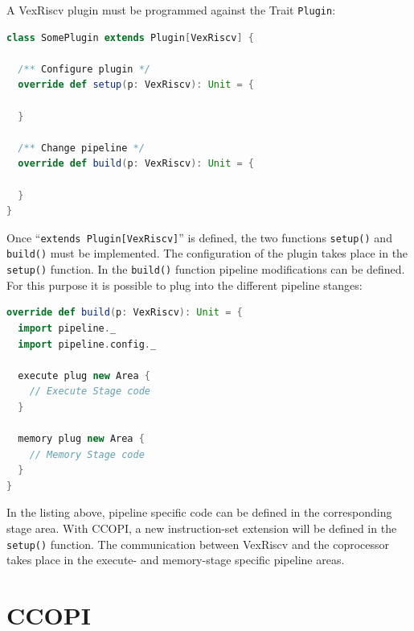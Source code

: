 \documentclass[twoside,twocolumn]{article}
\newcommand{\code}[1]{\texttt{#1}}
\begin{document}
A VexRiscv plugin must be programmed against the Trait \code{Plugin}:
\begin{lstlisting}[language=scala]
class SomePlugin extends Plugin[VexRiscv] {

  /** Configure plugin */
  override def setup(p: VexRiscv): Unit = {
  
  }
  
  /** Change pipeline */
  override def build(p: VexRiscv): Unit = {
  
  }
}
\end{lstlisting}
\noindent Once ``\code{extends Plugin[VexRiscv]}'' is defined, the two
functions \code{setup()} and \code{build()} must be implemented. The
configuration of the plugin takes place in the \code{setup()} function.
In the \code{build()} function pipeline modifications can be defined.
For this purpose it is possible to plug into the different pipeline
stanges:
\begin{lstlisting}[language=scala]
override def build(p: VexRiscv): Unit = {
  import pipeline._
  import pipeline.config._

  execute plug new Area {
    // Execute Stage code
  }

  memory plug new Area {
    // Memory Stage code
  }
}
\end{lstlisting}
In the listing above, pipeline specific code can be defined in the
corresponding stage area. With CCOPI, a new instruction-set extension
will be defined in the \code{setup()} function. The communication
between VexRiscv and the coprocessor takes place in the execute- and
memory-stage specific pipeline areas.

\section{CCOPI}
\end{document}
